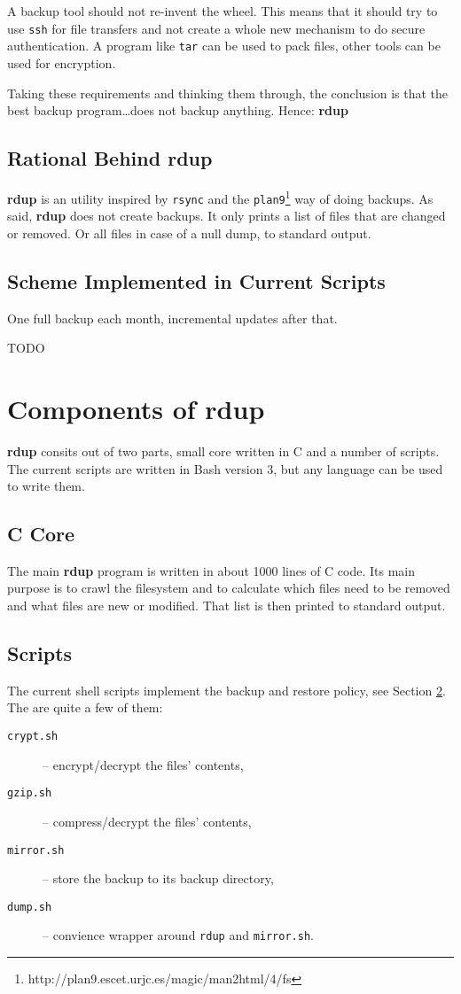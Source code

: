 \documentclass[a4paper, openany]{memoir}
\newcommand{\rdup}{\textbf{rdup}}
\newcommand{\cmd}[1]{\texttt{#1}}
\begin{document}
A backup tool should not re-invent the wheel.  This means that it should
try to use \cmd{ssh} for file transfers and not create a whole new
mechanism to do secure authentication. A program like \cmd{tar} can be
used to pack files, other tools can be used for encryption. 

Taking these requirements and thinking them through, the
conclusion is that the best backup program\ldots does not backup anything.
Hence: \rdup

\section{Rational Behind \rdup}
\rdup{} is an utility inspired by \cmd{rsync} and the 
\cmd{plan9}\footnote{http://plan9.escet.urjc.es/magic/man2html/4/fs} 
way of doing backups. As said, \rdup{} does not create backups. It only
prints a list of files that are changed or removed. Or all files in case
of a null dump, to standard output. 

\section{Scheme Implemented in Current Scripts}
\label{sec:scheme implemented in current scripts}
One full backup each month, incremental updates after that.

TODO


\chapter{Components of \rdup}

\rdup{} consits out of two parts, small core written in C and
a number of scripts. The current scripts are written in 
Bash version 3, but any language can be used to write them.

\section{C Core}
The main \rdup{} program is written in about 1000 lines of C code. Its
main purpose is to crawl the filesystem and to calculate which files
need to be removed and what files are new or modified. That list is then
printed to standard output.

\section{Scripts}
The current shell scripts implement the backup and restore policy, see
Section \ref{sec:scheme implemented in current scripts}.
The are quite a few of them:
\begin{description}
\item[\cmd{crypt.sh}]{-- encrypt/decrypt the files' contents,}
\item[\cmd{gzip.sh}]{-- compress/decrypt the files' contents,}
\item[\cmd{mirror.sh}]{-- store the backup to its backup directory,}
\item[\cmd{dump.sh}]{-- convience wrapper around \cmd{rdup} and \cmd{mirror.sh}.}
\end{description}
\end{document}
